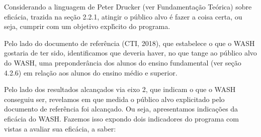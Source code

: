 \documentclass[
12pt,		%
openright,	%
twoside,  %
a4paper,			%
chapter=TITLE,		%
english,			%
french,				%
spanish,			%
brazil				%
]{USPSC-classe/USPSC}
\begin{document}
Considerando a linguagem de Peter Drucker (ver Fundamenta\c{c}\~ao Te\'orica) sobre efic\'acia, trazida na se\c{c}\~ao 2.2.1, atingir o p\'ublico alvo \'e \textquotedbl fazer a coisa certa\textquotedbl , ou seja, cumprir com um objetivo expl\'{\i}cito do programa.








Pelo lado do documento de refer\^encia  (CTI, 2018), que estabelece \textquotedbl o que o WASH gostaria de ter sido\textquotedbl , identificamos que deveria haver, no que tange ao p\'ublico alvo do WASH, uma preponder\^ancia dos alunos do ensino fundamental (ver se\c{c}\~ao 4.2.6) em rela\c{c}\~ao aos alunos do ensino m\'edio e superior.








Pelo lado dos resultados alcan\c{c}ados via eixo 2, que indicam \textquotedbl o que o WASH conseguiu ser\textquotedbl , revelamos em que medida o p\'ublico alvo explicitado pelo  documento de refer\^encia foi alcan\c{c}ado. Ou seja, apresentamos indica\c{c}\~oes da efic\'acia do WASH. Fazemos isso expondo dois indicadores do programa com vistas a avaliar sua efic\'acia, a saber:
\end{document}
